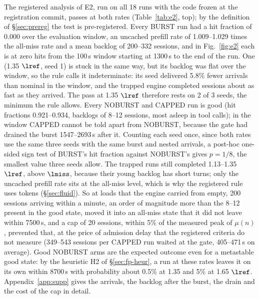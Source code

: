 The registered analysis of E2, run on all 18 runs with the code frozen at the registration commit, passes at both rates (Table~\ref{tab:e2}, top); by the definition of \S\ref{sec:prereg} the test is pre-registered. Every BURST run had a hit fraction of 0.000 over the evaluation window, an uncached prefill rate of 1.009--1.029 times the all-miss rate and a mean backlog of 200--332 sessions, and in Fig.~\ref{fig:e2} each is at zero hits from the 100\,s window starting at 1300\,s to the end of the run. One (1.35 $\lref$, seed 1) is stuck in the same way, but its backlog was flat over the window, so the rule calls it indeterminate: its seed delivered 5.8\% fewer arrivals than nominal in the window, and the trapped engine completed sessions about as fast as they arrived. The pass at 1.35 $\lref$ therefore rests on 2 of 3 seeds, the minimum the rule allows. Every NOBURST and CAPPED run is good (hit fractions 0.921--0.934, backlogs of 8--12 sessions, most asleep in tool calls); in the window CAPPED cannot be told apart from NOBURST, because the gate had drained the burst 1547--2693\,s after it. Counting each seed once, since both rates use the same three seeds with the same burst and nested arrivals, a post-hoc one-sided sign test of BURST's hit fraction against NOBURST's gives $p=1/8$, the smallest value three seeds allow. The trapped runs still completed 1.13--1.35 $\lref$, above $\lmiss$, because their young backlog has short turns; only the uncached prefill rate sits at the all-miss level, which is why the registered rule uses tokens (\S\ref{sec:fluid}). So at loads that the engine carried from empty, 200 sessions arriving within a minute, an order of magnitude more than the 8--12 present in the good state, moved it into an all-miss state that it did not leave within 7500\,s, and a cap of 20 sessions, within 5\% of the measured peak of $\mu(n)$, prevented that, at the price of admission delay that the registered criteria do not measure (349--543 sessions per CAPPED run waited at the gate, 405--471\,s on average). Good NOBURST arms are the expected outcome even for a metastable good state: by the heuristic H2 of \S\ref{sec:fp-heur}, a run at these rates leaves it on its own within 8700\,s with probability about 0.5\% at 1.35 and 5\% at 1.65 $\lref$. Appendix~\ref{app:supp} gives the arrivals, the backlog after the burst, the drain and the cost of the cap in detail.

